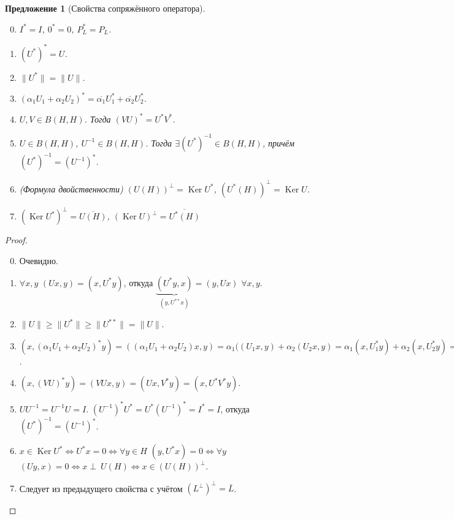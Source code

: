 \documentclass[11pt,openany,a4paper]{scrartcl}
\theoremstyle{plain}
\newtheorem{proposition}[theorem]{Предложение}
\theoremstyle{definition}
\newcommand\ol{\overline}
\DeclareMathOperator{\Ker}{Ker}
\begin{document}
\begin{proposition}[Свойства сопряжённого оператора]
\mbox{}
    \begin{enumerate}
        \setcounter{enumi}{-1}
        \item $I^\ast = I$, $0^\ast = 0$, $P_L^\ast = P_L$.
        \item $(U^\ast)^\ast = U$.
        \item $\|U^\ast\| = \|U\|$.
        \item $(\alpha_1U_1 + \alpha_2U_2)^\ast =
        \ol{\alpha_1}U_1^\ast + \ol{\alpha_2}U_2^\ast$.
        \item $U, V \in B(H, H)$. Тогда $(VU)^\ast = U^\ast V^\ast$.
        \item $U \in B(H, H)$, $U^{-1} \in B(H, H)$. Тогда
        $\exists (U^\ast)^{-1} \in B(H, H)$, причём
        $(U^\ast)^{-1} = (U^{-1})^\ast$.
        \item (Формула двойственности) $(U(H))^\perp = \Ker U^\ast$,
        $(U^\ast(H))^\perp = \Ker U$.
        \item $(\Ker U^\ast)^\perp = \ol{U(H)}$, $(\Ker U)^\perp = \ol{U^\ast(H)}$
    \end{enumerate}
\end{proposition}
\begin{proof}
\mbox{}
    \begin{enumerate}
        \setcounter{enumi}{-1}
        \item Очевидно.
        \item $\forall x,y$ $(Ux, y) = (x, U^\ast y)$, откуда
        $\underbrace{(U^\ast y, x)}_{(y, U^{\ast\ast}x)} = (y, Ux)$ $\forall x,y$.
        \item $\|U\| \geqslant \|U^\ast\| \geqslant \|U^{\ast\ast}\| = \|U\|$.
        \item $(x, (\alpha_1U_1 + \alpha_2U_2)^\ast y) =
        ((\alpha_1U_1 + \alpha_2U_2)x, y) =
        \alpha_1((U_1x, y) + \alpha_2(U_2x, y) =
        \alpha_1(x, U_1^\ast y) + \alpha_2(x, U_2^\ast y) =
        (x, \ol{\alpha_1}U_1^\ast y + \ol{\alpha_2}U_2^\ast y)$.
        \item $(x, (VU)^\ast y) = (VUx, y) = (Ux, V^\ast y) =
        (x, U^\ast V^\ast y)$.
        \item $UU^{-1} = U^{-1}U = I$. $(U^{-1})^\ast U^\ast =
        U^\ast(U^{-1})^\ast = I^\ast = I$, откуда
        $(U^\ast)^{-1} = (U^{-1})^\ast$.
        \item $x \in \Ker U^\ast \iff U^\ast x = 0 \iff \forall y\in H$
        $(y, U^\ast x) = 0 \iff \forall y$ $(Uy, x) = 0 \iff x \perp~U(H) \iff
        x \in (U(H))^\perp$.
        \item Следует из предыдущего свойства с учётом $(L^\perp)^\perp = \ol{L}$.
    \end{enumerate}
\end{proof}
\end{document}

